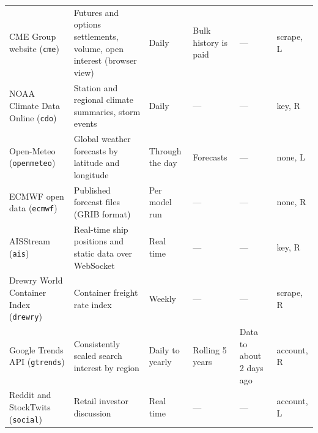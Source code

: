 \documentclass[10pt, a4paper, twocolumn]{article}
\newcommand{\sid}[1]{\texttt{\small #1}}   %
\newcommand{\ns}{---}                        %
\begin{document}
{\begin{longtable}{@{}L{3.1cm}L{4.65cm}L{1.85cm}L{2.5cm}L{2.7cm}L{1.35cm}@{}}
CME Group website (\sid{cme}) & Futures and options settlements, volume, open interest (browser view) & Daily & Bulk history is paid & \ns & scrape, L \\
NOAA Climate Data Online (\sid{cdo}) & Station and regional climate summaries, storm events & Daily & \ns & \ns & key, R \\
Open-Meteo (\sid{openmeteo}) & Global weather forecasts by latitude and longitude & Through the day & Forecasts & \ns & none, L \\
ECMWF open data (\sid{ecmwf}) & Published forecast files (GRIB format) & Per model run & \ns & \ns & none, R \\
AISStream (\sid{ais}) & Real-time ship positions and static data over WebSocket & Real time & \ns & \ns & key, R \\
Drewry World Container Index (\sid{drewry}) & Container freight rate index & Weekly & \ns & \ns & scrape, R \\
Google Trends API (\sid{gtrends}) & Consistently scaled search interest by region & Daily to yearly & Rolling 5 years & Data to about 2 days ago & account, R \\
Reddit and StockTwits (\sid{social}) & Retail investor discussion & Real time & \ns & \ns & account, L \\
\end{longtable}
}
\end{document}
